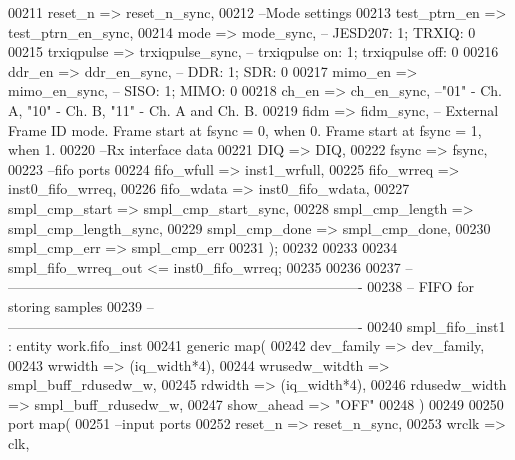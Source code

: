 \begin{DoxyCode}
00211       reset_n           => reset_n_sync,
00212 \textcolor{keyword}{      --Mode settings}
00213       test_ptrn_en      => test_ptrn_en_sync,
00214       mode              => mode_sync,\textcolor{keyword}{ -- JESD207: 1; TRXIQ: 0}
00215       trxiqpulse        => trxiqpulse_sync,\textcolor{keyword}{ -- trxiqpulse on: 1; trxiqpulse off: 0}
00216       ddr_en            => ddr_en_sync,\textcolor{keyword}{ -- DDR: 1; SDR: 0}
00217       mimo_en           => mimo_en_sync,\textcolor{keyword}{ -- SISO: 1; MIMO: 0}
00218       ch_en             => ch_en_sync,\textcolor{keyword}{ --"01" - Ch. A, "10" - Ch. B, "11" - Ch. A and Ch. B. }
00219       fidm              => fidm_sync,\textcolor{keyword}{ -- External Frame ID mode. Frame start at fsync = 0, when 0. Frame
       start at fsync = 1, when 1.}
00220 \textcolor{keyword}{      --Rx interface data }
00221       DIQ               => DIQ,
00222       fsync             => fsync,
00223 \textcolor{keyword}{      --fifo ports }
00224       fifo_wfull        => inst1_wrfull,
00225       fifo_wrreq        => inst0_fifo_wrreq,
00226       fifo_wdata        => inst0_fifo_wdata, 
00227       smpl_cmp_start    => smpl_cmp_start_sync,
00228       smpl_cmp_length   => smpl_cmp_length_sync,
00229       smpl_cmp_done     => smpl_cmp_done,
00230       smpl_cmp_err      => smpl_cmp_err
00231         \textcolor{vhdlchar}{)};
00232         
00233         
00234 \textcolor{vhdlchar}{smpl_fifo_wrreq_out} \textcolor{vhdlchar}{<=} \textcolor{vhdlchar}{inst0_fifo_wrreq}; 
00235         
00236                
00237 \textcolor{keyword}{-- ----------------------------------------------------------------------------}
00238 \textcolor{keyword}{-- FIFO for storing samples}
00239 \textcolor{keyword}{-- ----------------------------------------------------------------------------       }
00240 smpl\_fifo\_inst1 : \textcolor{keywordflow}{entity} work.fifo_inst
00241   \textcolor{keywordflow}{generic} \textcolor{keywordflow}{map}(
00242       dev_family      => dev_family, 
00243       wrwidth         => \textcolor{vhdlchar}{(}iq\_width*4\textcolor{vhdlchar}{)},
00244       wrusedw_witdth  => smpl_buff_rdusedw_w,
00245       rdwidth         => \textcolor{vhdlchar}{(}iq\_width*4\textcolor{vhdlchar}{)},
00246       rdusedw_width   => smpl_buff_rdusedw_w,
00247       show_ahead      => \textcolor{keyword}{"OFF"}
00248   \textcolor{vhdlchar}{)} 
00249 
00250   \textcolor{keywordflow}{port} \textcolor{keywordflow}{map}(
00251 \textcolor{keyword}{      --input ports }
00252       reset_n        => reset_n_sync,
00253       wrclk          => clk,

\end{DoxyCode}
